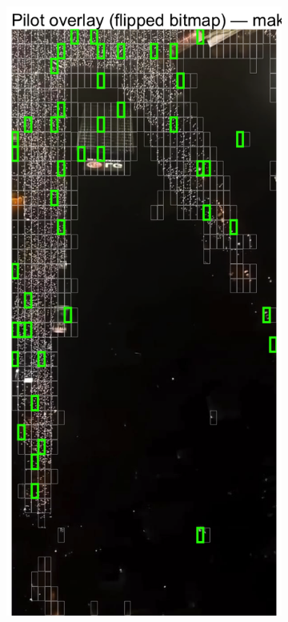 \documentclass[a4paper,12pt]{article}
\begin{document}
\begin{figure}[H]
	\begin{subfigure}[b]{0.3\textwidth}
	  \centering
	  \includegraphics[width=\textwidth]{../outputs/sampling_outputs/plot_overlays_image/pilot_overlay_makenzijeva.png}

\end{subfigure}
\end{figure}
\end{document}
